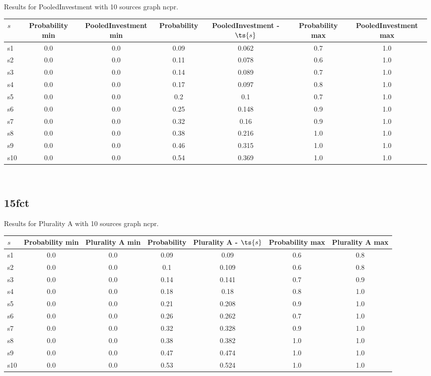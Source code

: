 \documentclass{article}
\begin{document}
\noindent Results for PooledInvestment with 10 sources graph ncpr.

\noindent\begin{tabular}{|l|c|c|c|c|c|c|}
\hline
$s$& Probability min & PooledInvestment min & Probability & PooledInvestment - $\ts{s}$ & Probability max & PooledInvestment max\\
\hline
s1 &0.0 & 0.0 & 0.09 & 0.062 & 0.7 & 1.0\\
\hline
s2 &0.0 & 0.0 & 0.11 & 0.078 & 0.6 & 1.0\\
\hline
s3 &0.0 & 0.0 & 0.14 & 0.089 & 0.7 & 1.0\\
\hline
s4 &0.0 & 0.0 & 0.17 & 0.097 & 0.8 & 1.0\\
\hline
s5 &0.0 & 0.0 & 0.2 & 0.1 & 0.7 & 1.0\\
\hline
s6 &0.0 & 0.0 & 0.25 & 0.148 & 0.9 & 1.0\\
\hline
s7 &0.0 & 0.0 & 0.32 & 0.16 & 0.9 & 1.0\\
\hline
s8 &0.0 & 0.0 & 0.38 & 0.216 & 1.0 & 1.0\\
\hline
s9 &0.0 & 0.0 & 0.46 & 0.315 & 1.0 & 1.0\\
\hline
s10 &0.0 & 0.0 & 0.54 & 0.369 & 1.0 & 1.0\\
\hline
\end{tabular}\\

\newpage

\subsection{15fct}

\noindent Results for Plurality A with 10 sources graph ncpr.

\noindent\begin{tabular}{|l|c|c|c|c|c|c|}
\hline
$s$& Probability min & Plurality A min & Probability & Plurality A - $\ts{s}$ & Probability max & Plurality A max\\
\hline
s1 &0.0 & 0.0 & 0.09 & 0.09 & 0.6 & 0.8\\
\hline
s2 &0.0 & 0.0 & 0.1 & 0.109 & 0.6 & 0.8\\
\hline
s3 &0.0 & 0.0 & 0.14 & 0.141 & 0.7 & 0.9\\
\hline
s4 &0.0 & 0.0 & 0.18 & 0.18 & 0.8 & 1.0\\
\hline
s5 &0.0 & 0.0 & 0.21 & 0.208 & 0.9 & 1.0\\
\hline
s6 &0.0 & 0.0 & 0.26 & 0.262 & 0.7 & 1.0\\
\hline
s7 &0.0 & 0.0 & 0.32 & 0.328 & 0.9 & 1.0\\
\hline
s8 &0.0 & 0.0 & 0.38 & 0.382 & 1.0 & 1.0\\
\hline
s9 &0.0 & 0.0 & 0.47 & 0.474 & 1.0 & 1.0\\
\hline
s10 &0.0 & 0.0 & 0.53 & 0.524 & 1.0 & 1.0\\
\hline
\end{tabular}\\
\end{document}
